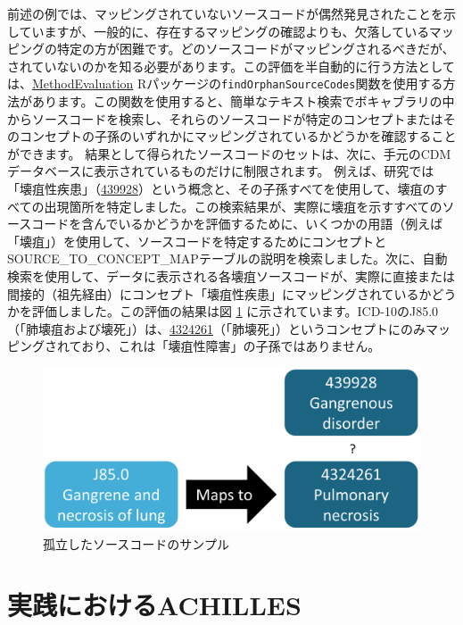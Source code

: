 \documentclass[
  11pt]{book}
\theoremstyle{definition}
\theoremstyle{definition}
\theoremstyle{definition}
\theoremstyle{definition}
\theoremstyle{remark}
\begin{document}
前述の例では、マッピングされていないソースコードが偶然発見されたことを示していますが、一般的に、存在するマッピングの確認よりも、欠落しているマッピングの特定の方が困難です。どのソースコードがマッピングされるべきだが、されていないのかを知る必要があります。この評価を半自動的に行う方法としては、\href{https://ohdsi.github.io/MethodEvaluation/}{MethodEvaluation} Rパッケージの\texttt{findOrphanSourceCodes}関数を使用する方法があります。この関数を使用すると、簡単なテキスト検索でボキャブラリの中からソースコードを検索し、それらのソースコードが特定のコンセプトまたはそのコンセプトの子孫のいずれかにマッピングされているかどうかを確認することができます。 結果として得られたソースコードのセットは、次に、手元のCDMデータベースに表示されているものだけに制限されます。 例えば、研究では「壊疽性疾患」（\href{http://athena.ohdsi.org/search-terms/terms/439928}{439928}）という概念と、その子孫すべてを使用して、壊疽のすべての出現箇所を特定しました。この検索結果が、実際に壊疽を示すすべてのソースコードを含んでいるかどうかを評価するために、いくつかの用語（例えば「壊疽」）を使用して、ソースコードを特定するためにコンセプトとSOURCE\_TO\_CONCEPT\_MAPテーブルの説明を検索しました。次に、自動検索を使用して、データに表示される各壊疽ソースコードが、実際に直接または間接的（祖先経由）にコンセプト「壊疽性疾患」にマッピングされているかどうかを評価しました。この評価の結果は図 \ref{fig:missingMapping} に示されています。ICD-10のJ85.0（「肺壊疽および壊死」）は、\href{http://athena.ohdsi.org/search-terms/terms/4324261}{4324261}（「肺壊死」）というコンセプトにのみマッピングされており、これは「壊疽性障害」の子孫ではありません。

\begin{figure}

{\centering \includegraphics[width=0.7\linewidth]{images/DataQuality/missingMapping} 

}

\caption{孤立したソースコードのサンプル}\label{fig:missingMapping}
\end{figure}

\section{実践におけるACHILLES}\label{achillesInPractice}
\end{document}
